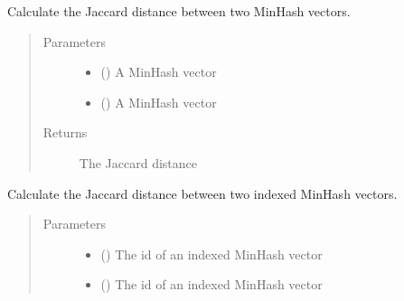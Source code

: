 \documentclass[letterpaper,10pt,english]{sphinxmanual}
\begin{document}
\begin{fulllineitems}
\begin{fulllineitems}
\label{\detokenize{documentation:tmap.LSHForest.get_distance}}
Calculate the Jaccard distance between two MinHash vectors.
\begin{quote}\begin{description}
\item[{Parameters}] \leavevmode\begin{itemize}
\item {} 
 () \textendash{} A MinHash vector

\item {} 
 () \textendash{} A MinHash vector

\end{itemize}

\item[{Returns}] \leavevmode
{} The Jaccard distance

\end{description}\end{quote}

\end{fulllineitems}


\begin{fulllineitems}
\label{\detokenize{documentation:tmap.LSHForest.get_distance_by_id}}
Calculate the Jaccard distance between two indexed MinHash vectors.
\begin{quote}\begin{description}
\item[{Parameters}] \leavevmode\begin{itemize}
\item {} 
 () \textendash{} The id of an indexed MinHash vector

\item {} 
 () \textendash{} The id of an indexed MinHash vector


\end{itemize}
\end{description}
\end{quote}
\end{fulllineitems}
\end{fulllineitems}
\end{document}
